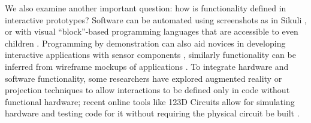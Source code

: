     We also examine another important question: how is functionality defined in interactive prototypes? Software can be automated using screenshots as in Sikuli \cite{yeh-sikuli}, or with visual ``block''-based programming languages that are accessible to even children \cite{resnick-scratch}. Programming by demonstration can also aid novices in developing interactive applications with sensor components \cite{hartmann-dtools}, similarly functionality can be inferred from wireframe mockups of applications \cite{li-framewire}. To integrate hardware and software functionality, some researchers have explored augmented reality \cite{nam-AR} or projection \cite{akaoka-displayobjects} techniques to allow interactions to be defined only in code without functional hardware; recent online tools like 123D Circuits allow for simulating hardware and testing code for it without requiring the physical circuit be built \cite{123dcircuits}.